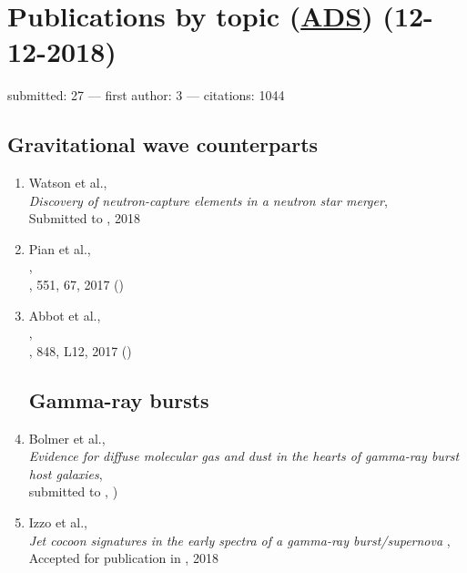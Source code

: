 
\section*{Publications  by topic (\href{\adsurl}{ADS}) (12-12-2018)}
    submitted: 27 ---
    first author: 3 ---
    citations: 1044


    \vspace{1em}

	\subsection*{\textbf{Gravitational wave counterparts}}
	\begin{enumerate}

\item Watson et al., \\
	{\it Discovery of neutron-capture elements in a neutron star merger}, \\
Submitted to \nature, 2018

\item Pian et al., \\
	, \\
	\nature, 551, 67, 2017 ()

\item Abbot et al., \\
	, \\
	\apjl, 848, L12, 2017 ()

\subsection*{Gamma-ray bursts}


\item Bolmer et al., \\
{\it Evidence for diffuse molecular gas and dust in the hearts of gamma-ray burst host galaxies}, \\
submitted to \aanda, )



\item Izzo et al., \\
{\it Jet cocoon signatures in the early spectra of a gamma-ray burst/supernova
}, \\
Accepted for publication in \nature, 2018




\end{enumerate}
